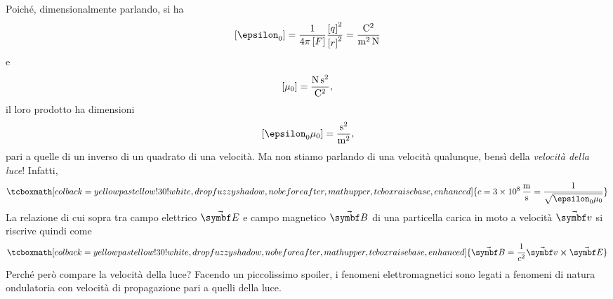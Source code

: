 Poiché, dimensionalmente parlando, si ha
\begin{equation*}
	\left[\epsilon_0\right]=\frac{1}{4\pi\left[F\right]}\frac{\left[q\right]^2}{\left[r\right]^2}=\unit[per-mode = fraction]{\coulomb\squared\per\meter\squared\per\newton}
\end{equation*}
e
\begin{equation*}
	\left[\mu_0\right]=\unit[per-mode = fraction]{\newton\second\squared\per\coulomb\squared},
\end{equation*}
il loro prodotto ha dimensioni
\begin{equation*}
	\left[\epsilon_0\mu_0\right]=\unit[per-mode = fraction]{\second\squared\per\meter\squared},
\end{equation*}
pari a quelle di un inverso di un quadrato di una velocità. Ma non stiamo parlando di una velocità qualunque, bensì della \textit{velocità della luce}! Infatti,
\begin{equation}
	\tcboxmath[colback=yellowpastellow!30!white,drop fuzzy shadow, nobeforeafter, math upper, tcbox raise base, enhanced]{c=\SI[per-mode = fraction]{3d8}{\meter\per\second}=\frac{1}{\sqrt{\epsilon_0\mu_0}}}
\end{equation}
La relazione di cui sopra tra campo elettrico $\vba{E}$ e campo magnetico $\vba{B}$ di una particella carica in moto a velocità $\vba{v}$ si riscrive quindi come
\begin{equation}
	\tcboxmath[colback=yellowpastellow!30!white,drop fuzzy shadow, nobeforeafter, math upper, tcbox raise base, enhanced]{\vba{B}=\frac{1}{c^2}\vba{v}\cross\vba{E}}
\end{equation}
Perché però compare la velocità della luce? Facendo un piccolissimo spoiler, i fenomeni elettromagnetici sono legati a fenomeni di natura ondulatoria con velocità di propagazione pari a quelli della luce.
